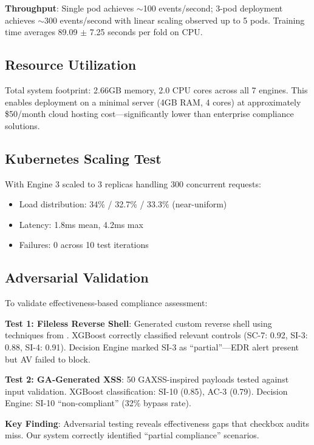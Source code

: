 \documentclass[11pt,conference]{IEEEtran}
\begin{document}
\textbf{Throughput}: Single pod achieves $\sim$100 events/second; 3-pod deployment achieves $\sim$300 events/second with linear scaling observed up to 5 pods. Training time averages 89.09 $\pm$ 7.25 seconds per fold on CPU.

\subsection{Resource Utilization}

Total system footprint: 2.66GB memory, 2.0 CPU cores across all 7 engines. This enables deployment on a minimal server (4GB RAM, 4 cores) at approximately \$50/month cloud hosting cost---significantly lower than enterprise compliance solutions.

\subsection{Kubernetes Scaling Test}

With Engine 3 scaled to 3 replicas handling 300 concurrent requests:
\begin{itemize}
    \item Load distribution: 34\% / 32.7\% / 33.3\% (near-uniform)
    \item Latency: 1.8ms mean, 4.2ms max
    \item Failures: 0 across 10 test iterations
\end{itemize}

\subsection{Adversarial Validation}

To validate effectiveness-based compliance assessment:

\textbf{Test 1: Fileless Reverse Shell}: Generated custom reverse shell using techniques from \cite{reverse_shell_paper}. XGBoost correctly classified relevant controls (SC-7: 0.92, SI-3: 0.88, SI-4: 0.91). Decision Engine marked SI-3 as ``partial''---EDR alert present but AV failed to block.

\textbf{Test 2: GA-Generated XSS}: 50 GAXSS-inspired payloads tested against input validation. XGBoost classification: SI-10 (0.85), AC-3 (0.79). Decision Engine: SI-10 ``non-compliant'' (32\% bypass rate).

\textbf{Key Finding}: Adversarial testing reveals effectiveness gaps that checkbox audits miss. Our system correctly identified ``partial compliance'' scenarios.
\end{document}
